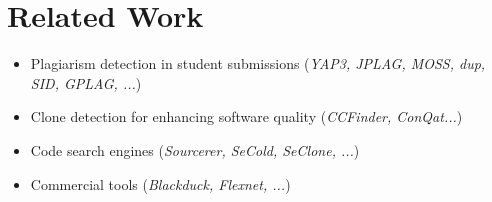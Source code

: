 
\section{Related Work}
\begin{frame}{\insertsection}
	\begin{itemize}
	\normalsize
	\item Plagiarism detection in student submissions (\textit{YAP3, JPLAG, MOSS, dup, SID, GPLAG, ...})
	\item Clone detection for enhancing software quality (\textit{CCFinder, ConQat...})
	\item Code search engines (\textit{Sourcerer, SeCold, SeClone, ...})
	\item Commercial tools (\textit{Blackduck, Flexnet, ...})
	\end{itemize}
\end{frame}